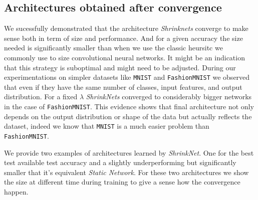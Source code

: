 \subsection{Architectures obtained after convergence}

We sucessfully demonstrated that the architecture \textit{Shrinknets} converge
to make sense both in term of size and performance. And for a given accuracy
the size needed is significantly smaller than when we use the classic heursitc
we commonly use to size convolutional neural networks. It might be an
indication that this strategy is suboptimal and might need to be adjusted.
During our experimentations on simpler datasets like \texttt{MNIST}
\cite{Lecun1998} and \texttt{FashionMNIST} \cite{Xiao2017} we observed that
even if they have the same number of classes, input features, and output
distribution. For a fixed $\lambda$ \textit{ShrinkNets} converged to
considerably bigger networks in the case of \texttt{FashionMNIST}. This
evidence shows that final architecture not only depends on the output
distribution or shape of the data but actually reflects the dataset, indeed we
know that \texttt{MNIST} is a much easier problem than \texttt{FashionMNIST}.

We provide two examples of architectures learned by \textit{ShrinkNet}. One
for the best test available test accuracy and a slightly underperforming but
significantly smaller that it's equivalent \textit{Static Network}. For
these two architectures we show the size at different time during training to
give a sense how the convergence happen.

